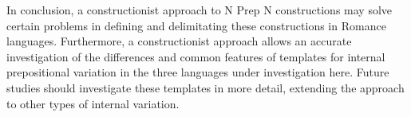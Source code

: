 \documentclass[output=paper]{langsci/langscibook}
\begin{document}
In conclusion, a constructionist approach to N Prep N constructions may solve certain problems in defining and delimitating these constructions in Romance languages. Furthermore, a constructionist approach allows an accurate investigation of the differences and common features of templates for internal prepositional variation in the three languages under investigation here. Future studies should investigate these templates in more detail, extending the approach to other types of internal variation. 


{\sloppy\printbibliography[heading=subbibliography,notkeyword=this]}
\end{document}
